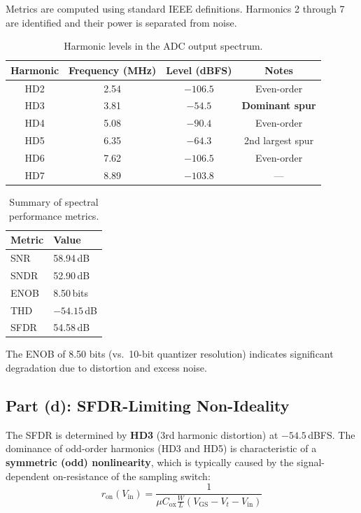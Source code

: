 \documentclass{article}
\begin{document}
Metrics are computed using standard IEEE definitions. Harmonics 2 through 7 are identified and their power is separated from noise.

\begin{table}[H]
\centering
\caption{Harmonic levels in the ADC output spectrum.}
\begin{tabular}{@{}cccc@{}}
\toprule
Harmonic & Frequency (MHz) & Level (dBFS) & Notes \\
\midrule
HD2 & 2.54  & $-106.5$ & Even-order \\
HD3 & 3.81  & $-54.5$  & \textbf{Dominant spur} \\
HD4 & 5.08  & $-90.4$  & Even-order \\
HD5 & 6.35  & $-64.3$  & 2nd largest spur \\
HD6 & 7.62  & $-106.5$ & Even-order \\
HD7 & 8.89  & $-103.8$ & --- \\
\bottomrule
\end{tabular}
\label{tab:harmonics}
\end{table}

\begin{table}[H]
\centering
\caption{Summary of spectral performance metrics.}
\begin{tabular}{@{}ll@{}}
\toprule
Metric & Value \\
\midrule
SNR   & 58.94\,dB \\
SNDR  & 52.90\,dB \\
ENOB  & 8.50\,bits \\
THD   & $-54.15$\,dB \\
SFDR  & 54.58\,dB \\
\bottomrule
\end{tabular}
\label{tab:metrics}
\end{table}

The ENOB of 8.50 bits (vs.\ 10-bit quantizer resolution) indicates significant degradation due to distortion and excess noise.

\subsection{Part (d): SFDR-Limiting Non-Ideality}

The SFDR is determined by \textbf{HD3} (3rd harmonic distortion) at $-54.5$\,dBFS. The dominance of odd-order harmonics (HD3 and HD5) is characteristic of a \textbf{symmetric (odd) nonlinearity}, which is typically caused by the signal-dependent on-resistance of the sampling switch:
\begin{equation}
    r_\text{on}(V_\text{in}) = \frac{1}{\mu C_\text{ox} \frac{W}{L} (V_\text{GS} - V_t - V_\text{in})}
\end{equation}
\end{document}
